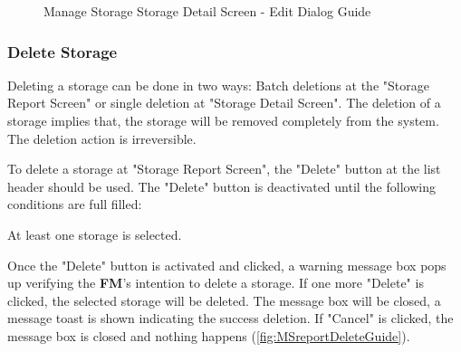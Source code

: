 \begin{figure}[H]
	\centering
    \vspace{5pt}
    \hspace{5pt}
    \caption{Manage Storage Storage Detail Screen - Edit Dialog Guide}
	\label{fig:MSDetailEditBtn}
\end{figure}

\subsubsection{Delete Storage}

Deleting a storage can be done in two ways: Batch deletions at the "Storage Report Screen" or single deletion at "Storage Detail Screen". 
The deletion of a storage implies that, the storage will be removed completely from the system. The deletion action is irreversible. 

To delete a storage at "Storage Report Screen", the "Delete" button at the list header should be used. The "Delete" button is deactivated until the following conditions are full filled:

\begin{compactenum}
    \item At least one storage is selected.
\end{compactenum}

Once the "Delete" button is activated and clicked, a warning message box pops up verifying the \textbf{FM}'s intention to delete a storage. If one more "Delete" is clicked, the selected storage will be deleted. The message box will be closed, a message toast is shown indicating the success deletion. If "Cancel" is clicked, the message box is closed and nothing happens (\autoref{fig:MSreportDeleteGuide}).

